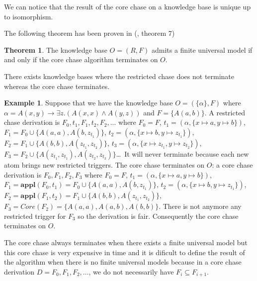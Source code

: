 \documentclass{article}
\theoremstyle{definition}
\newtheorem{theorem}{Theorem}[section]
\newtheorem{example}{Example}[section]
\theoremstyle{remark}
\newcommand{\Appl}{\textbf{appl}}
\begin{document}
We can notice that the result of the core chase on a knowledge base is unique up to isomorphism.


The following theorem has been proven in (\cite{core_chase}, theorem 7)

\begin{theorem}
The knowledge base $O = (R,F)$ admits a finite universal model if and only if the core chase algorithm terminates on $O$.
\end{theorem}


There exists knowledge bases where the restricted chase does not terminate whereas the core chase terminates. \begin{example}
Suppose that we have the knowledge base $O=(\{\alpha\},F)$ where $\alpha = A(x,y) \rightarrow \exists z.(A(x,x) \wedge A(y,z))$ and $F =  \{A(a,b)\}$. A restricted chase derivation is $F_0,t_1,F_1,t_2,F_2,...$ where $F_0 = F$, $t_1=(\alpha,\{x \mapsto a, y \mapsto b\})$, $F_1= F_0 \cup \{A(a,a),A(b,z_{t_1})\}$, $t_2 = (\alpha,\{x \mapsto b, y \mapsto z_{t_1}\})$, $F_2 = F_1 \cup \{A(b,b),A(z_{t_1},z_{t_2})\}$, $t_3 = (\alpha,\{x \mapsto z_{t_1}, y \mapsto z_{t_2}\})$, $F_3 =  F_2 \cup \{A(z_{t_1},z_{t_1}),A(z_{t_2},z_{t_3})\}$\ldots\ It will never terminate because each new atom brings new restricted triggers. The core chase terminates on $O$: a core chase derivation is $F_0,F_1,F_2,F_3$ where $F_0=F$, $t_1=(\alpha,\{x \mapsto a, y \mapsto b\})$, $F_1=\Appl(F_0,t_1) =F_0 \cup \{A(a,a),A(b,z_{t_1})\}$, $t_2 = (\alpha,\{x \mapsto b, y \mapsto z_{t_1}\})$, $F_2 =\Appl(F_1,t_2) =F_1 \cup \{A(b,b),A(z_{t_1},z_{t_2})\}$, $F_3 = \textit{Core}(F_2)= \{A(a,a),A(a,b),A(b,b)\}$. 
There is not anymore any restricted trigger for $F_3$ so the derivation is fair. Consequently the core chase terminates on $O$.
\end{example}
The core chase always terminates when there exists a finite universal model but this core chase is very expensive in time and it is dificult to define the result of the algorithm when there is no finite universal models because in a core chase derivation $D = F_0, F_1, F_2, \ldots$, we do not necessarily have $F_i \subseteq F_{i+1}$.
\end{document}
